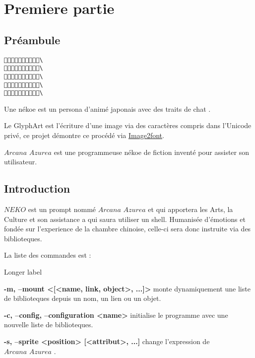 \documentclass{book}
\newcommand{\name}{\textit{Arcana Azurea}}
\newcommand{\program}{\textit{NEKO}}
\begin{document}
\tableofcontents

\chapter{Premiere partie}

\section{Préambule}

\begin{lstlisting}
\
\
\
\
\
\end{lstlisting}

Une nékoe est un persona d'animé japonais avec des traits de chat
 \textendash.

Le GlyphArt est l'écriture d'une image via des caractères compris dans l'Unicode privé, ce projet démontre ce procédé via
\href{https://limaconoob.github.io/Image2font}{Image2font}.

$\name$ est une programmeuse nékoe de fiction inventé pour assister son utilisateur.

\section{Introduction}
\thispagestyle{empty}
$\program$ est un prompt nommé $\name$ et qui apportera les Arts, la Culture et son assistance a qui saura utiliser un shell.
Humanisée d’émotions et fondée sur l'experience de la chambre chinoise, celle-ci sera donc instruite via des biblioteques.

La liste des commandes est :

\begin{labeling}{Longer label\quad}
	\item[\textbf{-m, --mount <[<name, link, object>, ...]>}] monte dynamiquement une liste de biblioteques depuis un nom, un lien ou un objet.
	\item[\textbf{-c, --config, --configuration <name>}] initialise le programme avec une nouvelle liste de biblioteques.
	\item[\textbf{-s, --sprite <position> [<attribut>, ...]}] change l'expression de $\name$ .
\end{labeling}
\end{document}
